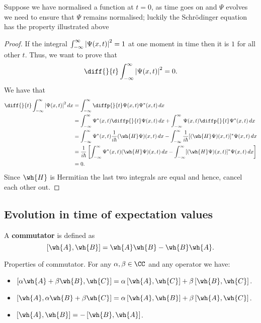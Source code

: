 \documentclass[12pt, a4paper]{article}
\begin{document}
\begin{mdnote}
    Suppose we have normalised a function at \(t=0\), as time goes on and \(\Psi\) evolves we need to ensure that \(\Psi\) remains normalised; luckily the Schrödinger equation has the property illustrated above
\end{mdnote}

\begin{proof}
    If the integral \(\int_{-\infty}^{\infty} \abs{\Psi(x,t)}^2 =1\) at one moment in time then it is \(1\) for all other \(t\). Thus, we want to prove that 
    \[\diff{}{t}\int_{-\infty}^{\infty} \abs{\Psi(x,t)}^2 =0.\]
    We have that 
    \[\begin{aligned}
        \diff{}{t}\int_{-\infty}^{\infty} \abs{\Psi(x,t)}^2 \, dx &= \int_{-\infty}^{\infty} \diffp{}{t} \Psi(x,t)\Psi^*(x,t) \, dx\\
        &= \int_{-\infty}^{\infty} \Psi^*(x,t)\diffp{}{t}\Psi(x,t) \, dx + \int_{-\infty}^{\infty} \Psi(x,t)\diffp{}{t}\Psi^*(x,t) \, dx \\
        &= \int_{-\infty}^{\infty} \Psi^*(x,t) \frac{1}{i \hbar} (\wh{H}\Psi)(x,t) \, dx - \int_{-\infty}^{\infty} \frac{1}{i \hbar} [(\wh{H}\Psi)(x,t)]^* \Psi(x,t) \, dx \\
        &= \frac{1}{i \hbar} \left[ \int_{-\infty}^{\infty} \Psi^*(x,t)(\wh{H}\Psi)(x,t) \, dx -  \int_{-\infty}^{\infty} [(\wh{H}\Psi)(x,t)]^* \Psi(x,t) \, dx  \right] \\
        &= 0.
    \end{aligned}\]
    Since \(\wh{H}\) is Hermitian the last two integrals are equal and hence, cancel each other out.
\end{proof}

\subsection{Evolution in time of expectation values}

\begin{definition}
    A \textbf{commutator} is defined as 
    \[[\wh{A}, \wh{B}] = \wh{A}\wh{B} - \wh{B}\wh{A}.\]
\end{definition}

\begin{theorem}
    Properties of commutator. For any \(\alpha, \beta \in \CC\) and any operator we have:
    \begin{itemize}
        \item \(\left[ \alpha \wh{A}+\beta\wh{B} , \wh{C}\right] = \alpha \left[ \wh{A},\wh{C} \right]+\beta \left[ \wh{B} , \wh{C}\right]\).
        \item \(\left[ \wh{A},\alpha\wh{B}+\beta\wh{C} \right] = \alpha\left[ \wh{A},\wh{B} \right]+\beta\left[\wh{A},\wh{C} \right]\).
        \item \(\left[ \wh{A},\wh{B} \right] = -\left[ \wh{B},\wh{A} \right]\).
    \end{itemize}
\end{theorem}
\end{document}
